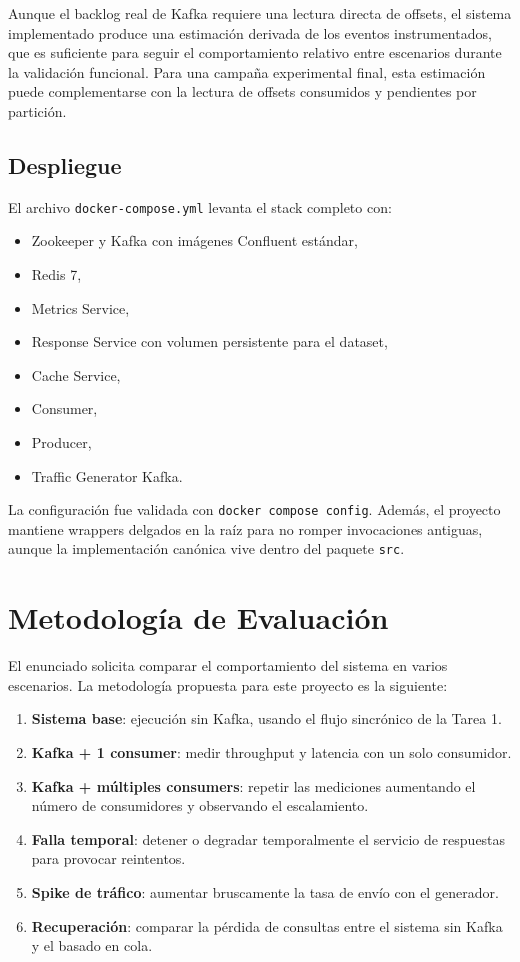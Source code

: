 \documentclass[letter,12pt]{article}
\begin{document}
Aunque el backlog real de Kafka requiere una lectura directa de offsets, el sistema implementado produce una estimaci\'on derivada de los eventos instrumentados, que es suficiente para seguir el comportamiento relativo entre escenarios durante la validaci\'on funcional. Para una campa\~na experimental final, esta estimaci\'on puede complementarse con la lectura de offsets consumidos y pendientes por partici\'on.

\subsection{Despliegue}
El archivo \texttt{docker-compose.yml} levanta el stack completo con:
\begin{itemize}
    \item Zookeeper y Kafka con im\'agenes Confluent est\'andar,
    \item Redis 7,
    \item Metrics Service,
    \item Response Service con volumen persistente para el dataset,
    \item Cache Service,
    \item Consumer,
    \item Producer,
    \item Traffic Generator Kafka.
\end{itemize}

La configuraci\'on fue validada con \texttt{docker compose config}. Adem\'as, el proyecto mantiene wrappers delgados en la ra\'iz para no romper invocaciones antiguas, aunque la implementaci\'on can\'onica vive dentro del paquete \texttt{src}.

\section{Metodolog\'ia de Evaluaci\'on}
El enunciado solicita comparar el comportamiento del sistema en varios escenarios. La metodolog\'ia propuesta para este proyecto es la siguiente:
\begin{enumerate}
    \item \textbf{Sistema base}: ejecuci\'on sin Kafka, usando el flujo sincr\'onico de la Tarea 1.
    \item \textbf{Kafka + 1 consumer}: medir throughput y latencia con un solo consumidor.
    \item \textbf{Kafka + m\'ultiples consumers}: repetir las mediciones aumentando el n\'umero de consumidores y observando el escalamiento.
    \item \textbf{Falla temporal}: detener o degradar temporalmente el servicio de respuestas para provocar reintentos.
    \item \textbf{Spike de tr\'afico}: aumentar bruscamente la tasa de env\'io con el generador.
    \item \textbf{Recuperaci\'on}: comparar la p\'erdida de consultas entre el sistema sin Kafka y el basado en cola.
\end{enumerate}
\end{document}
